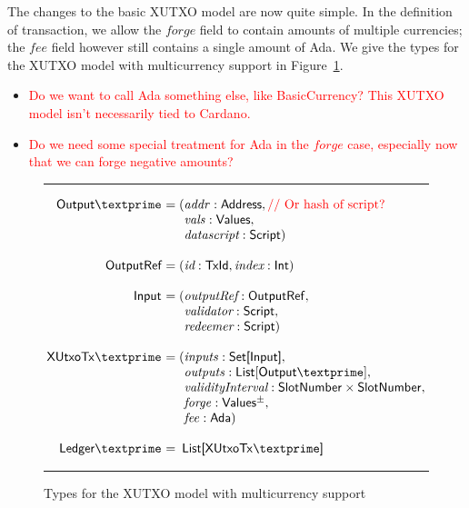 \documentclass[a4paper]{article}
\newcommand{\red}[1]{\textcolor{red}{#1}}
\renewcommand{\i}{\textit}  %
\newcommand{\s}{\textsf}  %
\theoremstyle{definition}  %
\newenvironment{arraydefs}[1]{\setlength{\arraycolsep}{0pt}\begin{array}{#1}}{\end{array}}
\newcommand\rfskip{7pt}
\newenvironment{ruledfigure}[1]{\begin{figure}[#1]\hrule\vspace{\rfskip}}{\vspace{\rfskip}\hrule\end{figure}}
\newcommand{\mi}[1]{\ensuremath{\mathit{#1}}}
\newcommand{\inputs}{\mi{inputs}}
\newcommand{\outputs}{\mi{outputs}}
\newcommand{\forge}{\mi{forge}}
\newcommand{\fee}{\mi{fee}}
\newcommand{\addr}{\mi{addr}}
\newcommand{\vals}{\mi{vals}}
\newcommand{\msf}[1]{\ensuremath{\mathsf{#1}}}
\newcommand{\slotnum}{\msf{SlotNumber}}
\newcommand{\xutxotx}{\msf{XUtxoTx}}
\begin{document}
\noindent The changes to the basic XUTXO model are now quite simple.
In the definition of transaction, we allow the \forge{} field to
contain amounts of multiple currencies; the \fee{} field however still
contains a single amount of \s{Ada}. We give the types for the XUTXO
model with multicurrency support in Figure~\ref{fig:mc-xutxo-types}.

\begin{itemize}
  \item\red{Do we want to call \s{Ada} something else, like {BasicCurrency}?
  This XUTXO model isn't necessarily tied to Cardano.}
  \item\red{Do we need some special treatment for Ada in the \forge{} case,
    especially now that we can forge negative amounts?}
\end{itemize}
 

\begin{ruledfigure}{H}
  \[
  \begin{arraydefs}{rll}
    \s{Output\textprime } &= (&\addr: \s{Address},  \red{\textrm{// Or hash of script?}}\\
    && \vals: \s{Values},\\
    && \i{datascript}: \s{Script})\\
    \\
    \s{OutputRef } &= (&\i{id}: \s{TxId}, \i{index}: \s{Int})\\
    \\
    \s{Input } &= (& \i{outputRef}: \sf{OutputRef},\\
                     && \i{validator}: \s{Script},\\
                     & & \i{redeemer}: \s{Script})\\
\\
    \xutxotx\textprime\s{ } &= ( &\inputs: \s{Set[Input]},\\
    &&\outputs: \mathsf{List[Output\textprime]},\\
    &&\i{validityInterval}: \slotnum \times \slotnum,\\
    &&\forge: \s{Values$^\pm$}, \\
    &&\fee: \s{Ada})\\
    \\
    \s{Ledger\textprime } &=&\!\s{List[}\xutxotx\textprime\s{]}\\
\end{arraydefs}
  \]
  \caption{Types for the XUTXO model with multicurrency support}
  \label{fig:mc-xutxo-types}
\end{ruledfigure}
\end{document}
